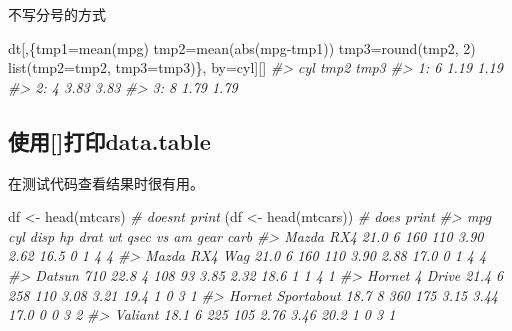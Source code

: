 \documentclass[
]{book}
\newenvironment{Shaded}{\begin{snugshade}}{\end{snugshade}}
\newcommand{\AttributeTok}[1]{\textcolor[rgb]{0.77,0.63,0.00}{#1}}
\newcommand{\CommentTok}[1]{\textcolor[rgb]{0.56,0.35,0.01}{\textit{#1}}}
\newcommand{\DecValTok}[1]{\textcolor[rgb]{0.00,0.00,0.81}{#1}}
\newcommand{\FunctionTok}[1]{\textcolor[rgb]{0.00,0.00,0.00}{#1}}
\newcommand{\NormalTok}[1]{#1}
\newcommand{\OtherTok}[1]{\textcolor[rgb]{0.56,0.35,0.01}{#1}}
\newcommand{\SpecialCharTok}[1]{\textcolor[rgb]{0.00,0.00,0.00}{#1}}
\begin{document}
不写分号的方式

\begin{Shaded}
\begin{Highlighting}[]
\NormalTok{dt[,\{tmp1}\OtherTok{=}\FunctionTok{mean}\NormalTok{(mpg)}
\NormalTok{     tmp2}\OtherTok{=}\FunctionTok{mean}\NormalTok{(}\FunctionTok{abs}\NormalTok{(mpg}\SpecialCharTok{{-}}\NormalTok{tmp1))}
\NormalTok{     tmp3}\OtherTok{=}\FunctionTok{round}\NormalTok{(tmp2, }\DecValTok{2}\NormalTok{)}
     \FunctionTok{list}\NormalTok{(}\AttributeTok{tmp2=}\NormalTok{tmp2, }\AttributeTok{tmp3=}\NormalTok{tmp3)\},}
\NormalTok{   by}\OtherTok{=}\NormalTok{cyl][]}
\CommentTok{\#\textgreater{}    cyl tmp2 tmp3}
\CommentTok{\#\textgreater{} 1:   6 1.19 1.19}
\CommentTok{\#\textgreater{} 2:   4 3.83 3.83}
\CommentTok{\#\textgreater{} 3:   8 1.79 1.79}
\end{Highlighting}
\end{Shaded}

\hypertarget{ux4f7fux7528ux6253ux5370data.table}{%
\subsection{使用{[}{]}打印data.table}\label{ux4f7fux7528ux6253ux5370data.table}}

在测试代码查看结果时很有用。

\begin{Shaded}
\begin{Highlighting}[]
\NormalTok{df }\OtherTok{\textless{}{-}} \FunctionTok{head}\NormalTok{(mtcars) }\CommentTok{\# doesn\textquotesingle{}t print}
\NormalTok{(df }\OtherTok{\textless{}{-}} \FunctionTok{head}\NormalTok{(mtcars)) }\CommentTok{\# does print}
\CommentTok{\#\textgreater{}                    mpg cyl disp  hp drat   wt qsec vs am gear carb}
\CommentTok{\#\textgreater{} Mazda RX4         21.0   6  160 110 3.90 2.62 16.5  0  1    4    4}
\CommentTok{\#\textgreater{} Mazda RX4 Wag     21.0   6  160 110 3.90 2.88 17.0  0  1    4    4}
\CommentTok{\#\textgreater{} Datsun 710        22.8   4  108  93 3.85 2.32 18.6  1  1    4    1}
\CommentTok{\#\textgreater{} Hornet 4 Drive    21.4   6  258 110 3.08 3.21 19.4  1  0    3    1}
\CommentTok{\#\textgreater{} Hornet Sportabout 18.7   8  360 175 3.15 3.44 17.0  0  0    3    2}
\CommentTok{\#\textgreater{} Valiant           18.1   6  225 105 2.76 3.46 20.2  1  0    3    1}
\end{Highlighting}
\end{Shaded}
\end{document}
